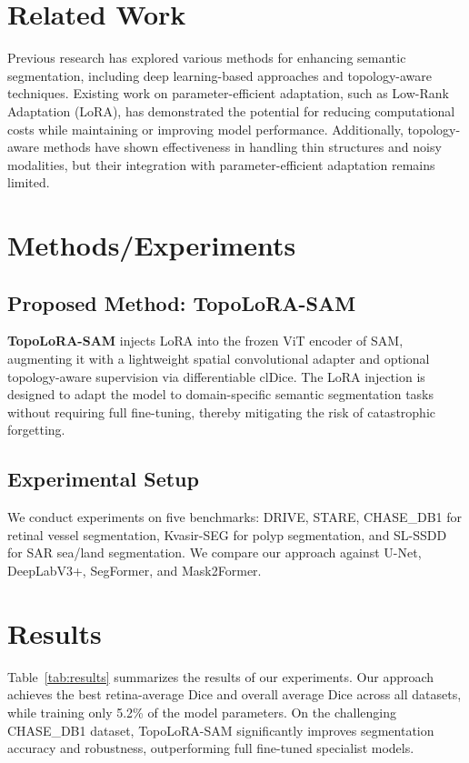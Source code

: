 \documentclass{article}
\begin{document}
\section*{Related Work}
Previous research has explored various methods for enhancing semantic segmentation, including deep learning-based approaches and topology-aware techniques. Existing work on parameter-efficient adaptation, such as Low-Rank Adaptation (LoRA), has demonstrated the potential for reducing computational costs while maintaining or improving model performance. Additionally, topology-aware methods have shown effectiveness in handling thin structures and noisy modalities, but their integration with parameter-efficient adaptation remains limited.

\section*{Methods/Experiments}
\subsection*{Proposed Method: TopoLoRA-SAM}
\textbf{TopoLoRA-SAM} injects LoRA into the frozen ViT encoder of SAM, augmenting it with a lightweight spatial convolutional adapter and optional topology-aware supervision via differentiable clDice. The LoRA injection is designed to adapt the model to domain-specific semantic segmentation tasks without requiring full fine-tuning, thereby mitigating the risk of catastrophic forgetting.

\subsection*{Experimental Setup}
We conduct experiments on five benchmarks: DRIVE, STARE, CHASE\_DB1 for retinal vessel segmentation, Kvasir-SEG for polyp segmentation, and SL-SSDD for SAR sea/land segmentation. We compare our approach against U-Net, DeepLabV3+, SegFormer, and Mask2Former.

\section*{Results}
Table~\ref{tab:results} summarizes the results of our experiments. Our approach achieves the best retina-average Dice and overall average Dice across all datasets, while training only 5.2\% of the model parameters. On the challenging CHASE\_DB1 dataset, TopoLoRA-SAM significantly improves segmentation accuracy and robustness, outperforming full fine-tuned specialist models.
\end{document}
